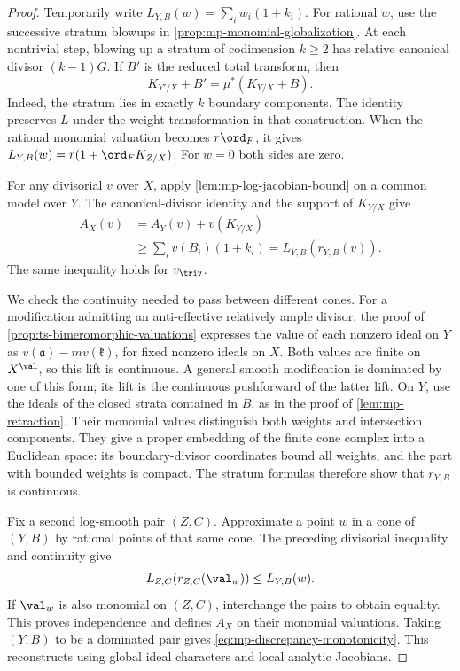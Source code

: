\begin{proof}
Temporarily write $L_{Y,B}(w)=\sum_i w_i(1+k_i)$.
For rational $w$, use the successive stratum blowups in
\cref{prop:mp-monomial-globalization}. At each nontrivial step,
blowing up a stratum of codimension $k\geq2$ has relative
canonical divisor $(k-1)G$.
If $B'$ is the reduced total transform, then
\[
                    K_{Y'/X}+B'=\mu^*(K_{Y/X}+B).
\]
Indeed, the stratum lies in exactly $k$ boundary components.
The identity preserves $L$ under the weight transformation in
that construction. When the rational monomial valuation becomes
$r\ord_F$, it gives $L_{Y,B}(w)=r(1+\ord_FK_{Z/X})$.
For $w=0$ both sides are zero.

For any divisorial $v$ over $X$, apply
\cref{lem:mp-log-jacobian-bound} on a common model over $Y$.
The canonical-divisor identity and the support of $K_{Y/X}$
give
\[
 \begin{aligned}
 A_X(v)&=A_Y(v)+v(K_{Y/X})\\
       &\geq\sum_i v(B_i)(1+k_i)
        =L_{Y,B}(r_{Y,B}(v)).
 \end{aligned}
\]
The same inequality holds for $v_{\triv}$.

We check the continuity needed to pass between different
cones. For a modification admitting an anti-effective
relatively ample divisor, the proof of
\cref{prop:ts-bimeromorphic-valuations} expresses the value
of each nonzero ideal on $Y$ as
$v(\mathfrak a)-m v(\mathfrak k)$, for fixed nonzero ideals
on $X$. Both values are finite on $X^{\val}$, so this lift
is continuous. A general smooth modification is dominated
by one of this form; its lift is the continuous pushforward
of the latter lift. On $Y$, use the ideals of the closed
strata contained in $B$, as in the proof of \cref{lem:mp-retraction}.
Their monomial values distinguish both weights and intersection
components. They give a proper embedding of the finite cone
complex into a Euclidean space: its boundary-divisor coordinates
bound all weights, and the part with bounded weights is compact.
The stratum formulas therefore show that $r_{Y,B}$ is continuous.

Fix a second log-smooth pair $(Z,C)$. Approximate a point $w$
in a cone of $(Y,B)$ by rational points of that same cone.
The preceding divisorial inequality and continuity give
\[
           L_{Z,C}(r_{Z,C}(\val_w))\leq L_{Y,B}(w).
\]
If $\val_w$ is also monomial on $(Z,C)$, interchange the
pairs to obtain equality. This proves independence and
defines $A_X$ on their monomial valuations. Taking
$(Y,B)$ to be a dominated pair gives
\eqref{eq:mp-discrepancy-monotonicity}. This reconstructs
\cite[Proposition~5.1 and the inequality in Lemma~5.3,
pp.~2179--2181]{JM12} using global ideal characters and
local analytic Jacobians.
\end{proof}

